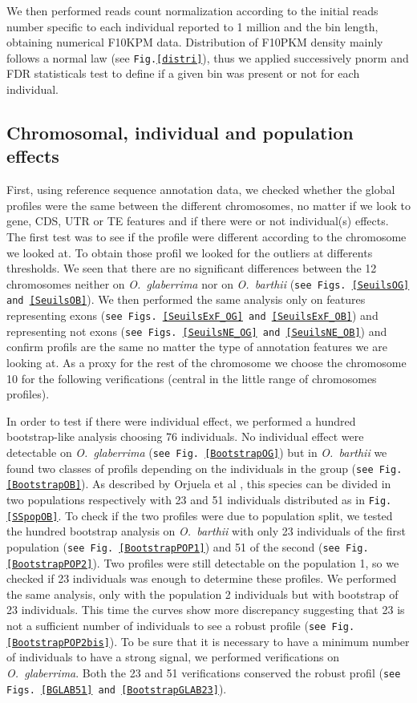 \documentclass[10pt,letterpaper]{article}
\begin{document}
We then performed reads count normalization according to the initial reads number specific to each individual reported to 1 million and the bin length, obtaining numerical F10KPM data. Distribution of F10PKM density mainly follows a normal law (see \texttt{Fig.\ref{distri}}), thus we applied successively pnorm and FDR statisticals test to define if a given bin was present or not for each individual.

  \subsection*{Chromosomal, individual and population effects}
  First, using reference sequence annotation data, we checked whether the global profiles were the same between the different chromosomes, no matter if we look to gene, CDS, UTR or TE features and if there were or not individual(s) effects. The first test was to see if the profile were different according to the chromosome we looked at. To obtain those profil we looked for the outliers at differents thresholds. 
  We seen that there are no significant differences between the 12 chromosomes neither on \emph{O.~glaberrima} nor on \emph{O.~barthii} (\texttt{see Figs.~\ref{SeuilsOG} and \ref{SeuilsOB}}).
  We then performed the same analysis only on features representing exons (\texttt{see Figs.~\ref{SeuilsExF_OG} and \ref{SeuilsExF_OB}}) and representing not exons (\texttt{see Figs.~\ref{SeuilsNE_OG} and \ref{SeuilsNE_OB}}) and confirm profils are the same no matter the type of annotation features we are looking at. As a proxy for the rest of the chromosome we choose the chromosome 10 for the following verifications (central in the little range of chromosomes profiles).
  
  In order to test if there were individual effect, we performed a hundred bootstrap-like analysis choosing 76 individuals.
  No individual effect were detectable on \emph{O.~glaberrima} (\texttt{see Fig. \ref{BootstrapOG}}) but in \emph{O.~barthii} we found two classes of profils depending on the individuals in the group 
  (\texttt{see Fig. \ref{BootstrapOB}}).
  As described by Orjuela et al \cite{Orjuela2014}, this species can be divided in two populations respectively with 23 and 51 individuals distributed as in \texttt{Fig. \ref{SSpopOB}}.
  To check if the two profiles were due to population split, we tested the hundred bootstrap analysis on \emph{O.~barthii} with only 23 individuals of the first population (\texttt{see Fig. \ref{BootstrapPOP1}}) 
  and 51 of the second (\texttt{see Fig. \ref{BootstrapPOP2}}).
  Two profiles were still detectable on the population 1, so we checked if 23 individuals was enough to determine these profiles. We performed the same analysis, only with the population 2 individuals but
  with bootstrap of 23 individuals. This time the curves show more discrepancy suggesting that 23 is not a sufficient number of individuals to see a robust profile (\texttt{see Fig. \ref{BootstrapPOP2bis}}).
  To be sure that it is necessary to have a minimum number of individuals to have a strong signal, we performed verifications on \emph{O.~glaberrima}. Both the 23 and 51 verifications conserved the robust profil 
  (\texttt{see Figs. \ref{BGLAB51} and \ref{BootstrapGLAB23}}).
  
\end{document}
